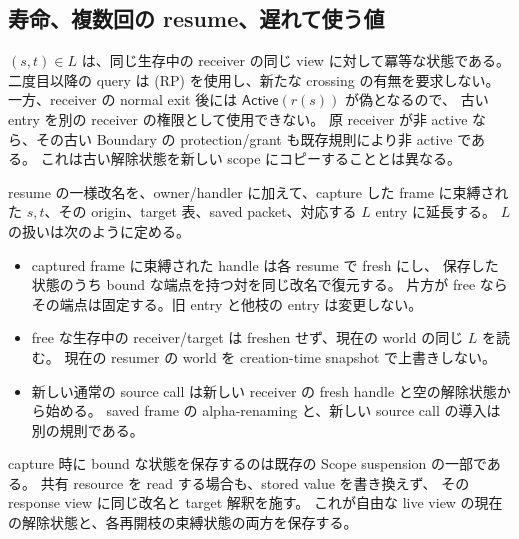 \documentclass[11pt,a4paper]{article}
\begin{document}
\subsection{寿命、複数回の resume、遅れて使う値}

\((s,t)\in L\) は、同じ生存中の receiver の同じ view に対して冪等な状態である。
二度目以降の query は (RP) を使用し、新たな crossing の有無を要求しない。
一方、receiver の normal exit 後には \(\mathsf{Active}(r(s))\) が偽となるので、
古い entry を別の receiver の権限として使用できない。
原 receiver が非 active なら、その古い Boundary の protection/grant も既存規則により非 active である。
これは古い解除状態を新しい scope にコピーすることとは異なる。

resume の一様改名を、owner/handler に加えて、capture した frame に束縛された
\(s,t\)、その origin、target 表、saved packet、対応する \(L\) entry に延長する。
\(L\) の扱いは次のように定める。
\begin{itemize}
\item captured frame に束縛された handle は各 resume で fresh にし、
保存した状態のうち bound な端点を持つ対を同じ改名で復元する。
片方が free ならその端点は固定する。旧 entry と他枝の entry は変更しない。
\item free な生存中の receiver/target は freshen せず、現在の world の同じ \(L\) を読む。
現在の resumer の world を creation-time snapshot で上書きしない。
\item 新しい通常の source call は新しい receiver の fresh handle と空の解除状態から始める。
saved frame の alpha-renaming と、新しい source call の導入は別の規則である。
\end{itemize}
capture 時に bound な状態を保存するのは既存の Scope suspension の一部である。
共有 resource を read する場合も、stored value を書き換えず、
その response view に同じ改名と target 解釈を施す。
これが自由な live view の現在の解除状態と、各再開枝の束縛状態の両方を保存する。
\end{document}
